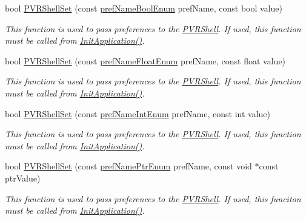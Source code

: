 \begin{DoxyCompactItemize}
bool \hyperlink{class_p_v_r_shell_afe4052dde87d659948defdd63529eee6}{P\+V\+R\+Shell\+Set} (const \hyperlink{_p_v_r_shell_8h_a3fa86f089e589b4785ebb9a217b9f8c5}{pref\+Name\+Bool\+Enum} pref\+Name, const bool value)
\begin{DoxyCompactList}\small\item\em This function is used to pass preferences to the \hyperlink{class_p_v_r_shell}{P\+V\+R\+Shell}. If used, this function must be called from \hyperlink{class_p_v_r_shell_a1ecb1d7021a3cc3f533acddc5ba8c1ce}{Init\+Application()}. \end{DoxyCompactList}\item 
bool \hyperlink{class_p_v_r_shell_a6659a2b7969325b0b25e8828df47681f}{P\+V\+R\+Shell\+Set} (const \hyperlink{_p_v_r_shell_8h_a428ec8d292e36ac8dbc77044dc25075c}{pref\+Name\+Float\+Enum} pref\+Name, const float value)
\begin{DoxyCompactList}\small\item\em This function is used to pass preferences to the \hyperlink{class_p_v_r_shell}{P\+V\+R\+Shell}. If used, this function must be called from \hyperlink{class_p_v_r_shell_a1ecb1d7021a3cc3f533acddc5ba8c1ce}{Init\+Application()}. \end{DoxyCompactList}\item 
bool \hyperlink{class_p_v_r_shell_a0ca4d24668c0e7477fbb8bc6dc988332}{P\+V\+R\+Shell\+Set} (const \hyperlink{_p_v_r_shell_8h_a78ec4653192043575302f1448ae7054e}{pref\+Name\+Int\+Enum} pref\+Name, const int value)
\begin{DoxyCompactList}\small\item\em This function is used to pass preferences to the \hyperlink{class_p_v_r_shell}{P\+V\+R\+Shell}. If used, this function must be called from \hyperlink{class_p_v_r_shell_a1ecb1d7021a3cc3f533acddc5ba8c1ce}{Init\+Application()}. \end{DoxyCompactList}\item 
bool \hyperlink{class_p_v_r_shell_a5ff09039b6b81dc2439224ca58a91c37}{P\+V\+R\+Shell\+Set} (const \hyperlink{_p_v_r_shell_8h_a946b110b552f1d833e359e6517647330}{pref\+Name\+Ptr\+Enum} pref\+Name, const void $\ast$const ptr\+Value)
\begin{DoxyCompactList}\small\item\em This function is used to pass preferences to the \hyperlink{class_p_v_r_shell}{P\+V\+R\+Shell}. If used, this funciton must be called from \hyperlink{class_p_v_r_shell_a1ecb1d7021a3cc3f533acddc5ba8c1ce}{Init\+Application()}. \end{DoxyCompactList}\item 

\end{DoxyCompactItemize}
